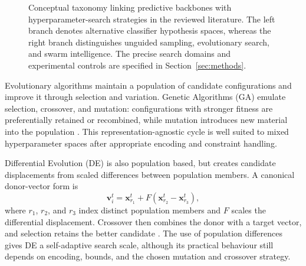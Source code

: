 \begin{figure}[htbp]
{%
}

\caption{
Conceptual taxonomy linking predictive backbones with
hyperparameter-search strategies in the reviewed literature.
The left branch denotes alternative classifier hypothesis spaces,
whereas the right branch distinguishes unguided sampling,
evolutionary search, and swarm intelligence.
The precise search domains and experimental controls are
specified in Section~\ref{sec:methods}.
}
\label{fig:backbone_optimizer_taxonomy}

\end{figure}

Evolutionary algorithms maintain a population of candidate configurations and improve it through selection and variation. Genetic Algorithms (GA) emulate selection, crossover, and mutation: configurations with stronger fitness are preferentially retained or recombined, while mutation introduces new material into the population \cite{goldberg1989ga, jovanovic2024wann}. This representation-agnostic cycle is well suited to mixed hyperparameter spaces after appropriate encoding and constraint handling.

Differential Evolution (DE) is also population based, but creates candidate displacements from scaled differences between population members. A canonical donor-vector form is
\begin{equation}\label{eq:de_mutation}
\mathbf{v}_{i}^{t} = \mathbf{x}_{r_1}^{t} + F\left(\mathbf{x}_{r_2}^{t} - \mathbf{x}_{r_3}^{t}\right),
\end{equation}
where $r_1$, $r_2$, and $r_3$ index distinct population members and $F$ scales the differential displacement. Crossover then combines the donor with a target vector, and selection retains the better candidate \cite{storn1997de}. The use of population differences gives DE a self-adaptive search scale, although its practical behaviour still depends on encoding, bounds, and the chosen mutation and crossover strategy.

